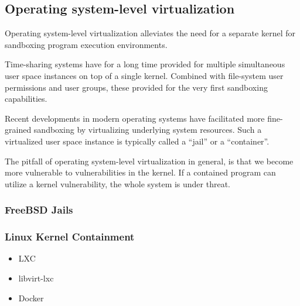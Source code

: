 \subsection{Operating system-level virtualization}

Operating system-level virtualization alleviates the need for a separate kernel
for sandboxing program execution environments.

Time-sharing systems have for a long time provided for multiple simultaneous
user space instances on top of a single kernel. Combined with file-system user
permissions and user groups, these provided for the very first sandboxing
capabilities.

Recent developments in modern operating systems have facilitated more
fine-grained sandboxing by virtualizing underlying system resources. Such a
virtualized user space instance is typically called a ``jail'' or a
``container''.

The pitfall of operating system-level virtualization in general, is that we
become more vulnerable to vulnerabilities in the kernel. If a contained program
can utilize a kernel vulnerability, the whole system is under threat.

\subsubsection{FreeBSD Jails}

\subsubsection{Linux Kernel Containment}

\begin{itemize}

\item LXC

\item libvirt-lxc

\item Docker

\end{itemize}

